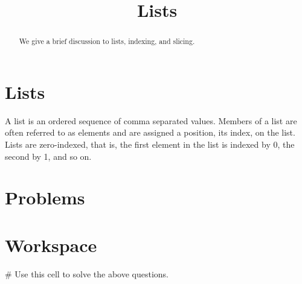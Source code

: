 \documentclass{ximera}
\title{Lists}
\begin{document}
  
\begin{abstract}  
We give a brief discussion to lists, indexing, and slicing.
\end{abstract}  
\maketitle

\section{Lists}

A list is an ordered sequence of comma separated values. Members of a list are often referred to as elements and are assigned a position, its index, on the list. Lists are zero-indexed, that is, the first element in the list is indexed by 0, the second by 1, and so on.



\section{Problems}

\begin{question}
\end{question}

\begin{question}
\end{question}

\section{Workspace}

\begin{sageCell}
# Use this cell to solve the above questions.
\end{sageCell}
\end{document}
